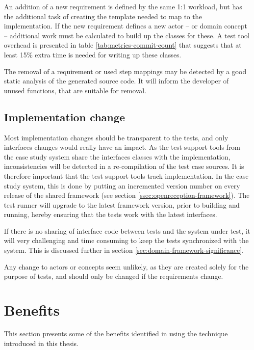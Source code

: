 \noindent An addition of a new requirement is defined by the same 1:1 workload, but has the additional task of creating the template needed to map to the implementation. If the new requirement defines a new actor -- or domain concept -- additional work must be calculated to build up the classes for these. A test tool overhead is presented in table \ref{tab:metrics-commit-count} that suggests that at least 15\% extra time is needed for writing up these classes.\medskip

\noindent The removal of a requirement or used step mappings may be detected by a good static analysis of the generated source code. It will inform the developer of unused functions, that are suitable for removal.

\subsection{Implementation change}
Most implementation changes should be transparent to the tests, and only interfaces changes would really have an impact. As the test support tools from the case study system share the interfaces classes with the implementation, inconsistencies will be detected in a re-compilation of the test case sources. It is therefore important that the test support tools track implementation. In the case study system, this is done by putting an incremented version number on every release of the shared framework (see section \ref{ssec:openreception-framework}). The test runner will upgrade to the latest framework version, prior to building and running, hereby ensuring that the tests work with the latest interfaces.\medskip

\noindent If there is no sharing of interface code between tests and the system under test, it will very challenging and time consuming to keep the tests synchronized with the system. This is discussed further in section \ref{sec:domain-framework-significance}.\medskip

\noindent Any change to actors or concepts seem unlikely, as they are created solely for the purpose of tests, and should only be changed if the requirements change.

\section{Benefits}
This section presents some of the benefits identified in using the technique introduced in this thesis.




